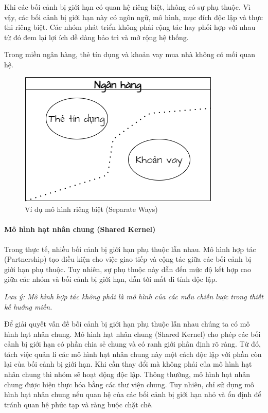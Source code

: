 Khi các bối cảnh bị giới hạn có quan hệ riêng biệt, không có sự phụ thuộc. Vì vậy, các bối cảnh bị giới hạn này có ngôn ngữ, mô hình, mục đích độc lập và thực thi riêng biệt. Các nhóm phát triển không phải cộng tác hay phối hợp với nhau từ đó đem lại lợi ích dễ dàng bảo trì và mở rộng hệ thống.

\begin{example} Trong miền     ngân hàng, thẻ tín dụng và khoản vay mua nhà không có mối quan hệ.

    \begin{figure}[H]

        \centering

        \includegraphics[scale = 0.5]{pictures/mo_hinh_rieng_biet_separate_ways/main.drawio.png}

        \caption{Ví dụ mô hình riêng biệt (Separate Ways)}

    \end{figure}

\end{example}


\paragraph{Mô hình hạt nhân chung (Shared Kernel)}




Trong thực tế, nhiều bối cảnh bị giới hạn phụ thuộc lẫn nhau. Mô hình hợp tác (Partnership) tạo điều kiện cho việc giao tiếp và cộng tác giữa các bối cảnh bị giới hạn phụ thuộc. Tuy nhiên, sự phụ thuộc này dẫn đến mức độ kết hợp cao giữa các nhóm và bối cảnh bị giới hạn, dẫn tới mất đi tính độc lập.

\emph{Lưu ý: Mô hình hợp tác không phải là mô hình của các mẫu chiến lược trong thiết kế huớng miền.}

Để giải quyết vấn đề bối cảnh bị giới hạn phụ thuộc lẫn nhau chúng ta có mô hình hạt nhân chung. Mô hình hạt nhân chung (Shared Kernel) cho phép các bối cảnh bị giới hạn có phần chia sẻ chung và có ranh giới phân định rõ ràng. Từ đó, tách việc quản lí các mô hình hạt nhân chung này một cách độc lập với phần còn lại của bối cảnh bị giới hạn. Khi cần thay đổi mà không phải của mô hình hạt nhân chung thì nhóm sẽ hoạt động độc lập. Thông thường, mô hình hạt nhân chung được hiện thực hóa bằng các thư viện chung. Tuy nhiên, chỉ sử dụng mô hình hạt nhân chung nếu quan hệ của các bối cảnh bị giới hạn nhỏ và ổn định để tránh quan hệ phức tạp và ràng buộc chặt chẽ.



